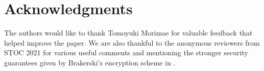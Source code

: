 \section*{Acknowledgments}

The authors would like to thank Tomoyuki Morimae for valuable feedback that helped improve the paper.
We are also thankful to the anonymous reviewers from STOC 2021 for various useful comments and mentioning the stronger security guarantees given by Brakerski's encryption scheme in \cite{brakerski_qfhe}. 